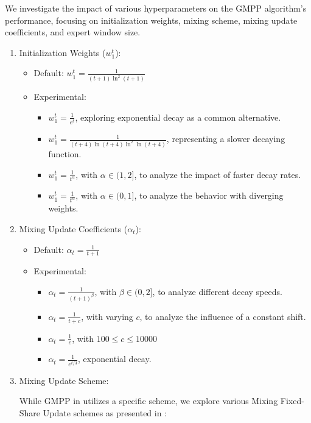 \documentclass[12pt, twoside]{article}
\begin{document}
We investigate the impact of various hyperparameters on the GMPP algorithm's performance, focusing on initialization weights, mixing scheme, mixing update coefficients, and expert window size. 
\begin{enumerate}
\item Initialization Weights ($w_1^t$):
\begin{itemize}
\item Default: $w_1^t = \frac{1}{(t+1)\ln^2(t+1)}$
\item Experimental: 
\begin{itemize}
\item $w_1^t = \frac{1}{e^t}$, exploring exponential decay as a common alternative.
\item $w_1^t = \frac{1}{(t+4)\ln(t+4)\ln^2\ln(t+4)}$, representing a slower decaying function.
\item $w_1^t = \frac{1}{t^\alpha}$, with $\alpha \in (1, 2]$, to analyze the impact of faster decay rates.
\item $w_1^t = \frac{1}{t^\alpha}$, with $\alpha \in (0, 1]$, to analyze the behavior with diverging weights.


\end{itemize}
\end{itemize}


\contourlength{0.1pt}

\item Mixing Update Coefficients ($\alpha_t$):
\begin{itemize}
\item Default: $\alpha_t = \frac{1}{t+1}$
\item Experimental: 
\begin{itemize}
\item $\alpha_t = \frac{1}{(t+1)^\beta}$, with $\beta \in (0, 2]$, to analyze different decay speeds.
\item $\alpha_t = \frac{1}{t+c}$, with varying $c$, to analyze the influence of a constant shift.
\item $\alpha_t = \frac{1}{c}$, with $100 \le c \le10000$
\item $\alpha_t = \frac{1}{e^{t/3}}$, exponential decay.         

\end{itemize}


\end{itemize}

\item Mixing Update Scheme:

While GMPP in \cite{vvbook} utilizes a specific scheme, we explore various Mixing Fixed-Share Update schemes as presented in \cite{article02}:


\end{enumerate}
\end{document}

